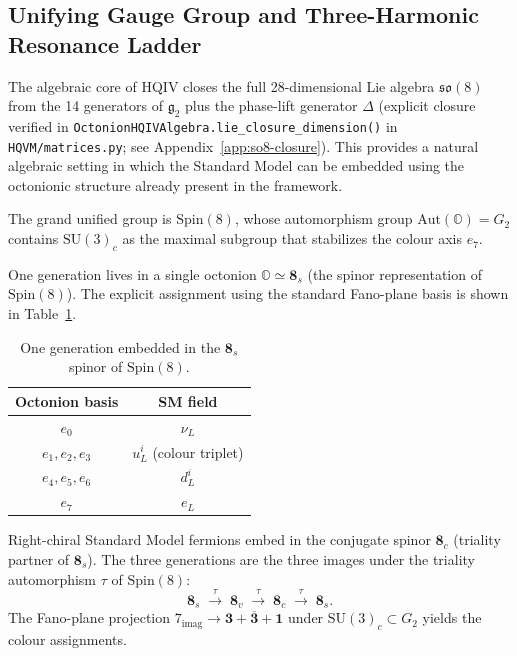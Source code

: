 \documentclass[12pt,a4paper]{article}
\begin{document}
\subsection{Unifying Gauge Group and Three-Harmonic Resonance Ladder}
\label{sec:spin8-gut}

The algebraic core of HQIV closes the full 28-dimensional Lie algebra \(\mathfrak{so}(8)\) from the 14 generators of \(\mathfrak{g}_2\) plus the phase-lift generator \(\Delta\) (explicit closure verified in \texttt{OctonionHQIVAlgebra.lie\_closure\_dimension()} in \texttt{HQVM/matrices.py}; see Appendix~\ref{app:so8-closure}). This provides a natural algebraic setting in which the Standard Model can be embedded using the octonionic structure already present in the framework.

The grand unified group is \(\mathrm{Spin}(8)\), whose automorphism group \(\mathrm{Aut}(\mathbb{O}) = G_2\) contains \(\mathrm{SU}(3)_c\) as the maximal subgroup that stabilizes the colour axis \(e_7\).

One generation lives in a single octonion \(\mathbb{O} \simeq \mathbf{8}_s\) (the spinor representation of \(\mathrm{Spin}(8)\)). The explicit assignment using the standard Fano-plane basis is shown in Table~\ref{tab:one-gen-embedding}.

\begin{table}[htbp]
\centering
\caption{One generation embedded in the \(\mathbf{8}_s\) spinor of \(\mathrm{Spin}(8)\).}
\label{tab:one-gen-embedding}
\begin{tabular}{c|c}
\toprule
Octonion basis & SM field \\
\midrule
\(e_0\) & \(\nu_L\) \\
\(e_1,e_2,e_3\) & \(u_L^i\) (colour triplet) \\
\(e_4,e_5,e_6\) & \(d_L^i\) \\
\(e_7\) & \(e_L\) \\
\bottomrule
\end{tabular}
\end{table}

Right-chiral Standard Model fermions embed in the conjugate spinor \(\mathbf{8}_c\) (triality partner of \(\mathbf{8}_s\)). The three generations are the three images under the triality automorphism \(\tau\) of \(\mathrm{Spin}(8)\):
\[
\mathbf{8}_s \;\xrightarrow{\tau}\; \mathbf{8}_v \;\xrightarrow{\tau}\; \mathbf{8}_c \;\xrightarrow{\tau}\; \mathbf{8}_s.
\]
The Fano-plane projection \(7_{\mathrm{imag}} \to \mathbf{3} + \overline{\mathbf{3}} + \mathbf{1}\) under \(\mathrm{SU}(3)_c \subset G_2\) yields the colour assignments.
\end{document}
